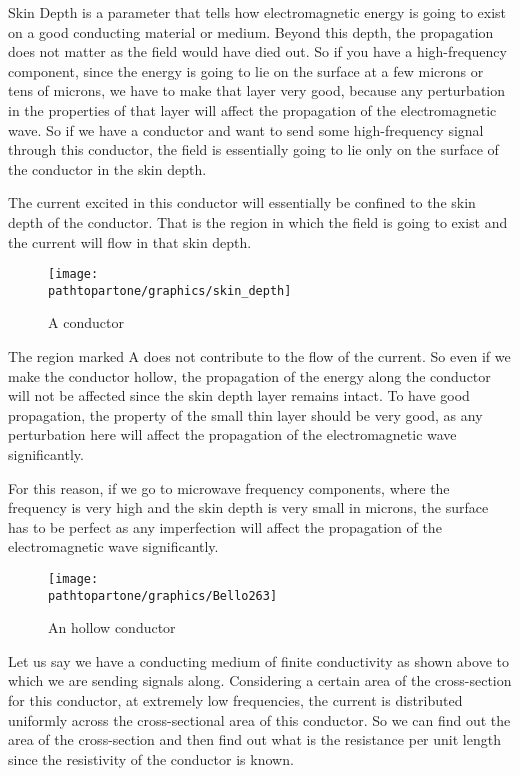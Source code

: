 Skin Depth is a parameter that tells how electromagnetic energy is going to exist on a good conducting material or medium. Beyond this depth, the propagation does not matter as the field would have died out. So if you have a high-frequency component, since the energy is going to lie on the surface at a few microns or tens of microns, we have to make that layer very good, because any perturbation in the properties of that layer will affect the propagation of the electromagnetic wave. So if we have a conductor and want to send some high-frequency signal through this conductor, the field is essentially going to lie only on the surface of the conductor in the skin depth.

The current excited in this conductor will essentially be confined to the skin depth of the conductor. That is the region in which the field is going to exist and the current will flow in that skin depth.
\begin{figure}[h]
\centering
\texttt{[image: \\pathtopartone/graphics/skin\_depth]}
\caption{A conductor}
\end{figure}

The region marked A does not contribute to the flow of the current. So even if we make the conductor hollow, the propagation of the energy along the conductor will not be affected since the skin depth layer remains intact. To have good propagation, the property of the small thin layer should be very good, as any perturbation here will affect the propagation of the electromagnetic wave significantly.

For this reason, if we go to microwave frequency components, where the frequency is very high and the skin depth is very small in microns, the surface has to be perfect as any imperfection will affect the propagation of the electromagnetic wave significantly.
\begin{figure}[h]
\centering
\texttt{[image: \\pathtopartone/graphics/Bello263]}
\caption{An hollow conductor}
\end{figure}

Let us say we have a conducting medium of finite conductivity as shown above to which we are sending signals along. Considering a certain area of the cross-section for this conductor, at extremely low frequencies, the current is distributed uniformly across the cross-sectional area of this conductor. So we can find out the area of the cross-section and then find out what is the resistance per unit length since the resistivity of the conductor is known.

